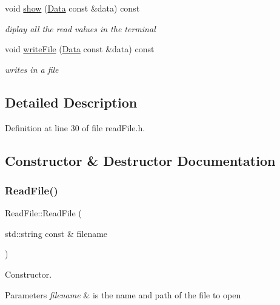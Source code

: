 \begin{DoxyCompactItemize}
void \mbox{\hyperlink{class_read_file_a0ac546e0980ee76612480df922728880}{show}} (\mbox{\hyperlink{struct_data}{Data}} const \&data) const
\begin{DoxyCompactList}\small\item\em diplay all the read values in the terminal \end{DoxyCompactList}\item 
void \mbox{\hyperlink{class_read_file_ab66909fd861779f01fde0e11aef0b77b}{write\+File}} (\mbox{\hyperlink{struct_data}{Data}} const \&data) const
\begin{DoxyCompactList}\small\item\em writes in a file \end{DoxyCompactList}\end{DoxyCompactItemize}


\subsection{Detailed Description}


Definition at line 30 of file read\+File.\+h.



\subsection{Constructor \& Destructor Documentation}
\mbox{\label{class_read_file_ae297f0539380fc9b703a1bceda2ce820}} 
\subsubsection{\texorpdfstring{Read\+File()}{ReadFile()}}
{\footnotesize\ttfamily Read\+File\+::\+Read\+File (\begin{DoxyParamCaption}\item[{std\+::string const \&}]{filename }\end{DoxyParamCaption})\hspace{0.3cm}{\ttfamily [explicit]}}



Constructor. 


\begin{DoxyParams}{Parameters}
{\em filename} & is the name and path of the file to open \\
\hline
\end{DoxyParams}


